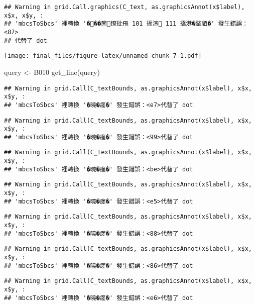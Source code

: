 \documentclass[
]{article}
\newenvironment{Shaded}{\begin{snugshade}}{\end{snugshade}}
\newcommand{\FunctionTok}[1]{\textcolor[rgb]{0.00,0.00,0.00}{#1}}
\newcommand{\NormalTok}[1]{#1}
\newcommand{\OtherTok}[1]{\textcolor[rgb]{0.56,0.35,0.01}{#1}}
\newcommand{\StringTok}[1]{\textcolor[rgb]{0.31,0.60,0.02}{#1}}
\begin{document}
\begin{verbatim}
## Warning in grid.Call.graphics(C_text, as.graphicsAnnot(x$label), x$x, x$y, :
## 'mbcsToSbcs' 裡轉換 '���箇憭批飛 101 撟渲 111 撟港�摮貊�' 發生錯誤：<87>
## 代替了 dot
\end{verbatim}

\texttt{[image: final\_files/figure-latex/unnamed-chunk-7-1.pdf]}

\begin{Shaded}
\begin{Highlighting}[]
\NormalTok{query }\OtherTok{\textless{}{-}} \StringTok{\textquotesingle{}B010\textquotesingle{}}
\FunctionTok{get\_line}\NormalTok{(query)}
\end{Highlighting}
\end{Shaded}

\begin{verbatim}
## Warning in grid.Call(C_textBounds, as.graphicsAnnot(x$label), x$x, x$y, :
## 'mbcsToSbcs' 裡轉換 '�曉�瘥�' 發生錯誤：<e7>代替了 dot
\end{verbatim}

\begin{verbatim}
## Warning in grid.Call(C_textBounds, as.graphicsAnnot(x$label), x$x, x$y, :
## 'mbcsToSbcs' 裡轉換 '�曉�瘥�' 發生錯誤：<99>代替了 dot
\end{verbatim}

\begin{verbatim}
## Warning in grid.Call(C_textBounds, as.graphicsAnnot(x$label), x$x, x$y, :
## 'mbcsToSbcs' 裡轉換 '�曉�瘥�' 發生錯誤：<be>代替了 dot
\end{verbatim}

\begin{verbatim}
## Warning in grid.Call(C_textBounds, as.graphicsAnnot(x$label), x$x, x$y, :
## 'mbcsToSbcs' 裡轉換 '�曉�瘥�' 發生錯誤：<e5>代替了 dot
\end{verbatim}

\begin{verbatim}
## Warning in grid.Call(C_textBounds, as.graphicsAnnot(x$label), x$x, x$y, :
## 'mbcsToSbcs' 裡轉換 '�曉�瘥�' 發生錯誤：<88>代替了 dot
\end{verbatim}

\begin{verbatim}
## Warning in grid.Call(C_textBounds, as.graphicsAnnot(x$label), x$x, x$y, :
## 'mbcsToSbcs' 裡轉換 '�曉�瘥�' 發生錯誤：<86>代替了 dot
\end{verbatim}

\begin{verbatim}
## Warning in grid.Call(C_textBounds, as.graphicsAnnot(x$label), x$x, x$y, :
## 'mbcsToSbcs' 裡轉換 '�曉�瘥�' 發生錯誤：<e6>代替了 dot
\end{verbatim}
\end{document}
